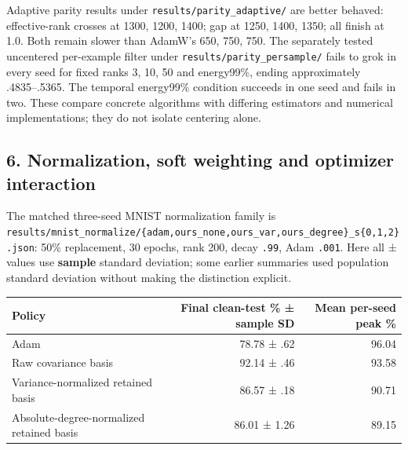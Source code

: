 \documentclass[
  british,
  10pt,
  a4paper,
]{article}
\newcounter{none} %
\begin{document}
Adaptive parity results under
\texttt{results/\allowbreak{}parity\_\allowbreak{}adaptive/\allowbreak{}}
are better behaved: effective-\allowbreak{}rank crosses at 1300, 1200,
1400; gap at 1250, 1400, 1350; all finish at 1.0. Both remain slower
than AdamW's 650, 750, 750. The separately tested uncentered
per-\allowbreak{}example filter under
\texttt{results/\allowbreak{}parity\_\allowbreak{}persample/\allowbreak{}}
fails to grok in every seed for fixed ranks 3, 10, 50 and energy99\%,
ending approximately .\allowbreak{}4835–.\allowbreak{}5365.\allowbreak{}
The temporal energy99\% condition succeeds in one seed and fails in two.
These compare concrete algorithms with differing estimators and
numerical implementations; they do not isolate centering alone.

\subsection{\texorpdfstring{6. Normalizatio\allowbreak{}n,\allowbreak{}
soft weighting and optimizer
interaction}{6.  soft weighting and optimizer interaction}}\label{classical-evidence--normalization-soft-weighting-and-optimizer-interaction}

The matched three-seed MNIST normalization family is
\texttt{results/\allowbreak{}mnist\_\allowbreak{}normalize/\allowbreak{}\{\allowbreak{}adam,\allowbreak{}ours\_\allowbreak{}none,\allowbreak{}ours\_\allowbreak{}var,\allowbreak{}ours\_\allowbreak{}degree\}\allowbreak{}\_\allowbreak{}s\{\allowbreak{}0,\allowbreak{}1,\allowbreak{}2\}\allowbreak{}.\allowbreak{}json}:
50\% replacement,\allowbreak{} 30 epochs, rank 200, decay \texttt{.99},
Adam \texttt{.001}. Here all ± values use \textbf{sample} standard
deviation; some earlier summaries used population standard deviation
without making the distinction explicit.

{\def\LTcaptype{none} %
\begin{longtable}[]{@{}lrr@{}}
\toprule\noalign{}
Policy & Final clean-test \% ± sample SD & Mean per-seed peak \% \\
\midrule\noalign{}
\endhead
\bottomrule\noalign{}
\endlastfoot
Adam & 78.78 ± .62 & 96.04 \\
Raw covariance basis & 92.14 ± .46 & 93.58 \\
Variance-\allowbreak{}normalized retained basis & 86.57 ± .18 & 90.71 \\
Absolute-\allowbreak{}degree-\allowbreak{}normalized retained basis &
86.01 ± 1.26 & 89.15 \\
\end{longtable}
}
\end{document}
